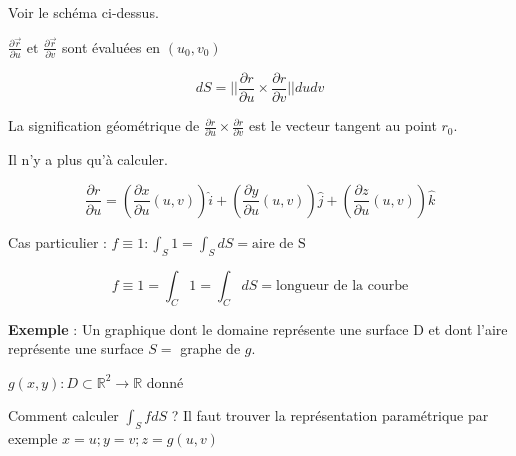 Voir le schéma ci-dessus.

$\frac{\partial \vec r }{\partial u } \text{ et } \frac{\partial \vec r }{\partial v }$ sont évaluées en $(u_0,v_0)$

\[dS = ||\frac{\partial r }{\partial u } \times \frac{\partial r }{\partial v } || du dv\]

La signification géométrique de $ \frac{\partial r }{\partial u } \times \frac{\partial r }{\partial v }$ est le vecteur tangent au point $r_0$.

Il n'y a plus qu'à calculer.

\[\frac{\partial r }{\partial u} =
\left( \frac{\partial x}{\partial u}(u,v)\right)\hat i +
\left( \frac{\partial y}{\partial u}(u,v)\right)\hat j +
\left(\frac{\partial z}{\partial u}(u,v)\right)\hat k
\]



Cas particulier : $f\equiv 1 : \int_S 1 = \int_S dS = \text{aire de S}$

\[f \equiv 1 = \int_C 1 = \int_C dS = \text{longueur de la courbe}\]


\textbf{Exemple }: Un graphique dont le domaine représente une surface D et dont l'aire représente une surface $S=$ graphe de $g$.


 $g(x,y) : D\subset\mathbb{R}^2 \to \mathbb{R}$ donné


Comment calculer $\int_Sf dS$ ? Il faut trouver la représentation paramétrique par exemple
$x=u; y=v; z=g(u,v)$


